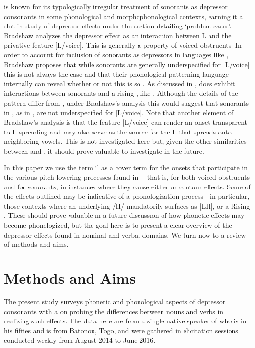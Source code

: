 \documentclass[output=paper
,newtxmath
,modfonts
,nonflat]{langsci/langscibook}
\begin{document}
 is known for its typologically irregular treatment of sonorants as depressor consonants in some phonological and morphophonological contexts, earning it a slot in  study of depressor effects under the section detailing ‘problem cases’. Bradshaw analyzes the depressor effect as an interaction between L  and the privative feature [L/voice]. This is generally a property of voiced obstruents. In order to account for inclusion of sonorants as depressors in languages like , Bradshaw proposes that while sonorants are generally underspecified for [L/voice] this is not always the case and that their phonological patterning language-internally can reveal whether or not this is so \citep[169-170]{Bradshaw1999}. As discussed in ,  does exhibit interactions between sonorants and a rising , like . Although the details of the pattern differ from , under Bradshaw's analysis this would suggest that sonorants in , as in , are not underspecified for [L/voice]. Note that another element of Bradshaw’s analysis is that the feature [L/voice] can render an onset transparent to L  spreading and may also serve as the source for the L  that spreads onto neighboring vowels. This is not investigated here but, given the other similarities between  and , it should prove valuable to investigate in the future.

In this paper we use the term ‘’ as a cover term for the onsets that participate in the various pitch-lowering processes found in —that is, for both voiced obstruents and for sonorants, in instances where they cause either  or contour effects. Some of the effects outlined may be indicative of a phonologization process—in particular, those contexts where an underlying /H/  mandatorily surfaces as [LH], or a Rising . These should prove valuable in a future discussion of how phonetic effects may become phonologized, but the goal here is to present a clear overview of the depressor effects found in nominal and verbal domains. We turn now to a review of methods and aims.

\section{Methods and Aims}\label{sec:lotven:3}

The present study surveys phonetic and phonological aspects of  depressor consonants with a  on probing the differences between nouns and verbs in realizing such effects. The data here are from a single native speaker of  who is in his fifties and is from Batonou, Togo, and were gathered in elicitation sessions conducted weekly from August 2014 to June 2016. 
\end{document}
